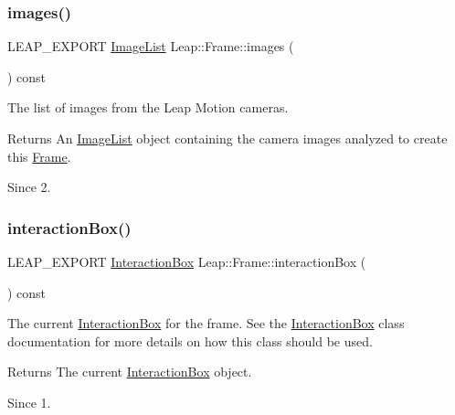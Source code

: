 \subsubsection{\texorpdfstring{images()}{images()}}
{\footnotesize\ttfamily L\+E\+A\+P\+\_\+\+E\+X\+P\+O\+RT \hyperlink{class_leap_1_1_image_list}{Image\+List} Leap\+::\+Frame\+::images (\begin{DoxyParamCaption}{ }\end{DoxyParamCaption}) const}

The list of images from the Leap Motion cameras.

\begin{DoxyReturn}{Returns}
An \hyperlink{class_leap_1_1_image_list}{Image\+List} object containing the camera images analyzed to create this \hyperlink{class_leap_1_1_frame}{Frame}. 
\end{DoxyReturn}
\begin{DoxySince}{Since}
2. 
\end{DoxySince}
\mbox{\label{class_leap_1_1_frame_a1c591dacf806716d9c0b11767e77ba48}} 
\subsubsection{\texorpdfstring{interaction\+Box()}{interactionBox()}}
{\footnotesize\ttfamily L\+E\+A\+P\+\_\+\+E\+X\+P\+O\+RT \hyperlink{class_leap_1_1_interaction_box}{Interaction\+Box} Leap\+::\+Frame\+::interaction\+Box (\begin{DoxyParamCaption}{ }\end{DoxyParamCaption}) const}

The current \hyperlink{class_leap_1_1_interaction_box}{Interaction\+Box} for the frame. See the \hyperlink{class_leap_1_1_interaction_box}{Interaction\+Box} class documentation for more details on how this class should be used.


\begin{DoxyCodeInclude}
\end{DoxyCodeInclude}


\begin{DoxyReturn}{Returns}
The current \hyperlink{class_leap_1_1_interaction_box}{Interaction\+Box} object. 
\end{DoxyReturn}
\begin{DoxySince}{Since}
1. 
\end{DoxySince}
\mbox{\label{class_leap_1_1_frame_a069854a98be43ae91a9f23058674d2eb}} 
